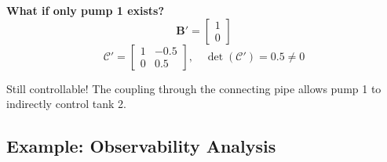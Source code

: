 \begin{example}
\textbf{What if only pump 1 exists?}
\begin{equation}
\mathbf{B}' = \begin{bmatrix} 1 \\ 0 \end{bmatrix}
\end{equation}
\begin{equation}
\mathcal{C}' = \begin{bmatrix} 1 & -0.5 \\ 0 & 0.5 \end{bmatrix}, \quad \det(\mathcal{C}') = 0.5 \neq 0
\end{equation}

Still controllable! The coupling through the connecting pipe allows pump 1 to indirectly control tank 2.
\end{example}

\subsection{Example: Observability Analysis}

